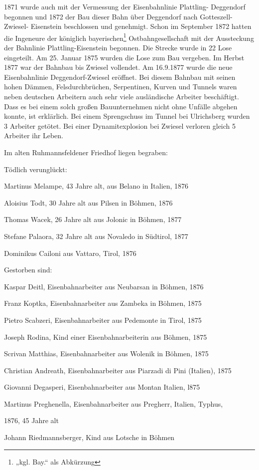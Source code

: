 \documentclass{book}
\begin{document}
1871 wurde auch mit der Vermessung der Eisenbahnlinie Plattling-
Deggendorf begonnen und 1872 der Bau dieser Bahn über Deggendorf nach
Gotteszell-Zwiesel- Eisenstein beschlossen und genehmigt. Schon im
September 1872 hatten die Ingeneure der königlich
bayerischen\footnote{„kgl. Bay.“ als Abkürzung} Ostbahngesellschaft mit
der Aussteckung der Bahnlinie Plattling-Eisenstein begonnen. Die Strecke
wurde in 22 Lose eingeteilt. Am 25. Januar 1875 wurden die Lose zum Bau
vergeben. Im Herbst 1877 war der Bahnbau bis Zwiesel vollendet. Am
16.9.1877 wurde die neue Eisenbahnlinie Deggendorf-Zwiesel eröffnet. Bei
diesem Bahnbau mit seinen hohen Dämmen, Felsdurchbrüchen, Serpentinen,
Kurven und Tunnels waren neben deutschen Arbeitern auch sehr viele
ausländische Arbeiter beschäftigt. Dass es bei einem solch großen
Bauunternehmen nicht ohne Unfälle abgehen konnte, ist erklärlich. Bei
einem Sprengschuss im Tunnel bei Ulrichsberg wurden 3 Arbeiter getötet.
Bei einer Dynamitexplosion bei Zwiesel verloren gleich 5 Arbeiter ihr
Leben.

Im alten Ruhmannsfeldener Friedhof liegen begraben:

Tödlich verunglückt:

\begin{compactitem}
\item Martinus Melampe, 43 Jahre alt, aus Belano in Italien, 1876
\item Aloisius Todt, 30 Jahre alt aus Pilsen in Böhmen, 1876
\item Thomas Wacek, 26 Jahre alt aus Jolonic in Böhmen, 1877
\item Stefane Palaora, 32 Jahre alt aus Novaledo in Südtirol, 1877
\item Dominikus Cailoni aus Vattaro, Tirol, 1876
\end{compactitem}

Gestorben sind:

\begin{compactitem}
\item Kaspar Deitl, Eisenbahnarbeiter aus Neubarsan in Böhmen, 1876
\item Franz Koptka, Eisenbahnarbeiter aus Zambeka in Böhmen, 1875
\item Pietro Scabzeri, Eisenbahnarbeiter aus Pedemonte in Tirol, 1875
\item Joseph Rodina, Kind einer Eisenbahnarbeiterin aus Böhmen, 1875
\item Scrivan Matthias, Eisenbahnarbeiter aus Wolenik in Böhmen, 1875

\item Christian Andreath, Eisenbahnarbeiter aus Piarzadi di Pini
(Italien), 1875

\item Giovanni Degasperi, Eisenbahnarbeiter aus Montan Italien, l875

\item Martinus Preghenella, Eisenbahnarbeiter aus Pregherr, Italien,
Typhus,

1876, 45 Jahre alt
\item Johann Riedmannsberger, Kind aus Lotsche in Böhmen
\end{compactitem}
\end{document}
